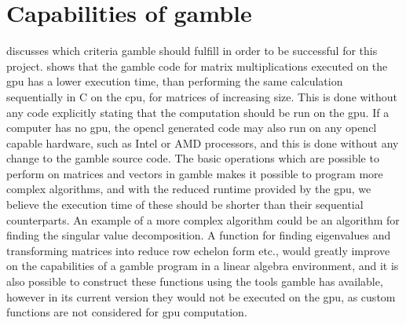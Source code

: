 \section{Capabilities of \gls{gamble}}
 discusses which criteria \gls{gamble} should fulfill in order to be successful for this project.
 shows that the \gls{gamble} code for matrix multiplications executed on the \acrshort{gpu} has a lower execution time, than performing the same calculation sequentially in C on the \acrshort{cpu}, for matrices of increasing size.
This is done without any code explicitly stating that the computation should be run on the \acrshort{gpu}.
If a computer has no \acrshort{gpu}, the \gls{opencl} generated code may also run on any \gls{opencl} capable hardware, such as Intel or AMD processors, and this is done without any change to the \gls{gamble} source code.
The basic operations which are possible to perform on matrices and vectors in \gls{gamble} makes it possible to program more complex algorithms, and with the reduced runtime provided by the \acrshort{gpu}, we believe the execution time of these should be shorter than their sequential counterparts.
An example of a more complex algorithm could be an algorithm for finding the singular value decomposition.
A function for finding eigenvalues and transforming matrices into reduce row echelon form etc., would greatly improve on the capabilities of a \gls{gamble} program in a linear algebra environment, and it is also possible to construct these functions using the tools \gls{gamble} has available, however in its current version they would not be executed on the \acrshort{gpu}, as custom functions are not considered for  \acrshort{gpu} computation.